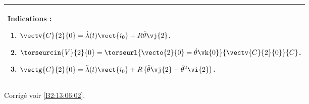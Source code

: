 \ifprof
\else
\footnotesize
\begin{center}
\begin{tabular}{|p{.9\linewidth}|}
\hline
Indications :
\begin{enumerate}
\item $\vectv{C}{2}{0} =\dot{\lambda}(t) \vect{i_0} + R \dot{\theta} \vj{2}$.
\item $\torseurcin{V}{2}{0}=\torseurl{\vecto{2}{0}=\dot{\theta}\vk{0}}{\vectv{C}{2}{0}}{C}$.
\item $\vectg{C}{2}{0} =\ddot{\lambda}(t) \vect{i_0} + R \left(\ddot{\theta} \vj{2} - \dot{\theta}^2 \vi{2}\right) $.
\end{enumerate} \\ \hline
\end{tabular}
\end{center}
\normalsize
\begin{flushright}
\footnotesize{Corrigé  voir \ref{B2:13:06:02}.}
\end{flushright}%
\fi
